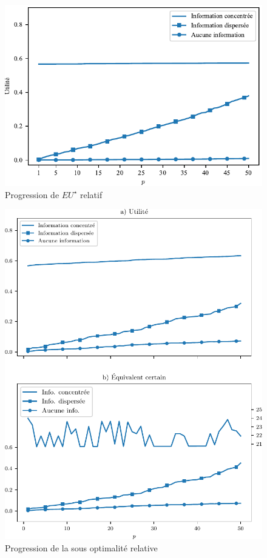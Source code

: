 \begin{figure}[h!]
  \centering
  \includegraphics[width=\textwidth]{../../experiments/fig/pconst_euinforelative.pdf}
  \caption{Progression de $EU^\star$ relatif}
  \label{fig_pconst_euinforelative}
\end{figure}

\begin{figure}[h!]
  \centering
  \includegraphics[width=\textwidth]{../../experiments/fig/pconst_infosorelative.pdf}
  \caption{Progression de la sous optimalité relative}
  \label{fig_pconst_infosorelative}
\end{figure}


